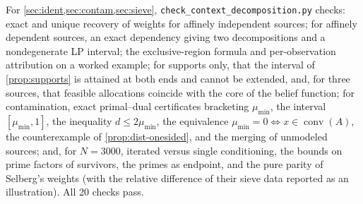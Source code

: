 \documentclass[11pt]{article}
\theoremstyle{definition}
\theoremstyle{remark}
\begin{document}
For \cref{sec:ident,sec:contam,sec:sieve}, \texttt{check\_context\_decomposition.py} checks: exact and
unique recovery of weights for affinely independent sources; for affinely dependent sources, an exact
dependency giving two decompositions and a nondegenerate LP interval; the exclusive-region formula and
per-observation attribution on a worked example; for supports only, that the interval of
\cref{prop:supports} is attained at both ends and cannot be extended, and, for three sources, that
feasible allocations coincide with the core of the belief function; for contamination, exact
primal--dual certificates bracketing $\mu_{\min}$, the interval $[\mu_{\min},1]$, the inequality
$d\le2\mu_{\min}$, the equivalence $\mu_{\min}=0\iff x\in\operatorname{conv}(A)$, the counterexample of
\cref{prop:dist-onesided}, and the merging of unmodeled sources; and, for $N=3000$, iterated versus
single conditioning, the bounds on prime factors of survivors, the primes as endpoint, and the pure
parity of Selberg's weights (with the relative difference of their sieve data reported as an
illustration). All 20 checks pass.
\end{document}
